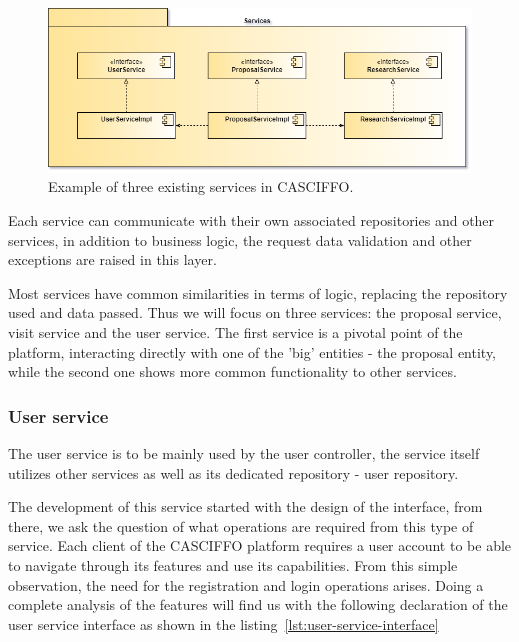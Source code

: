\begin{figure}[H]
    \centering
    \includegraphics[scale=0.5]{Chapters/img/architecture/domain-services-example.png}
    \caption{Example of three existing services in CASCIFFO.}
    \label{fig:domain-services-example}
\end{figure}


Each service can communicate with their own associated repositories and other services, in addition to business logic, the request data validation and other exceptions are raised in this layer.

Most services have common similarities in terms of logic, replacing the repository used and data passed. Thus we will focus on three services: the proposal service, visit service and the user service. The first service is a pivotal point of the platform, interacting directly with one of the 'big' entities - the proposal entity, while the second one shows more common functionality to other services.


\subsubsection{User service}

The user service is to be mainly used by the user controller, the service itself utilizes other services as well as its dedicated repository - user repository.


The development of this service started with the design of the interface, from there, we ask the question of what operations are required from this type of service. Each client of the CASCIFFO platform requires a user account to be able to navigate through its features and use its capabilities. From this simple observation, the need for the registration and login operations arises. Doing a complete analysis of the features will find us with the following declaration of the user service interface as shown in the listing~\ref{lst:user-service-interface}

